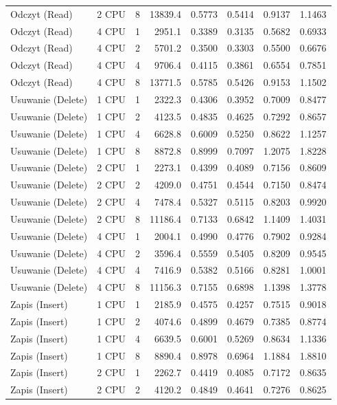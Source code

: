 \begin{table}[ht]
{\begin{tabular}{llcrrrrr}
Odczyt (Read) & 2 CPU & 8 & 13839.4 & 0.5773 & 0.5414 & 0.9137 & 1.1463 \\
Odczyt (Read) & 4 CPU & 1 & 2951.1 & 0.3389 & 0.3135 & 0.5682 & 0.6933 \\
Odczyt (Read) & 4 CPU & 2 & 5701.2 & 0.3500 & 0.3303 & 0.5500 & 0.6676 \\
Odczyt (Read) & 4 CPU & 4 & 9706.4 & 0.4115 & 0.3861 & 0.6554 & 0.7851 \\
Odczyt (Read) & 4 CPU & 8 & 13771.5 & 0.5785 & 0.5426 & 0.9153 & 1.1502 \\
Usuwanie (Delete) & 1 CPU & 1 & 2322.3 & 0.4306 & 0.3952 & 0.7009 & 0.8477 \\
Usuwanie (Delete) & 1 CPU & 2 & 4123.5 & 0.4835 & 0.4625 & 0.7292 & 0.8657 \\
Usuwanie (Delete) & 1 CPU & 4 & 6628.8 & 0.6009 & 0.5250 & 0.8622 & 1.1257 \\
Usuwanie (Delete) & 1 CPU & 8 & 8872.8 & 0.8999 & 0.7097 & 1.2075 & 1.8228 \\
Usuwanie (Delete) & 2 CPU & 1 & 2273.1 & 0.4399 & 0.4089 & 0.7156 & 0.8609 \\
Usuwanie (Delete) & 2 CPU & 2 & 4209.0 & 0.4751 & 0.4544 & 0.7150 & 0.8474 \\
Usuwanie (Delete) & 2 CPU & 4 & 7478.4 & 0.5327 & 0.5115 & 0.8203 & 0.9920 \\
Usuwanie (Delete) & 2 CPU & 8 & 11186.4 & 0.7133 & 0.6842 & 1.1409 & 1.4031 \\
Usuwanie (Delete) & 4 CPU & 1 & 2004.1 & 0.4990 & 0.4776 & 0.7902 & 0.9284 \\
Usuwanie (Delete) & 4 CPU & 2 & 3596.4 & 0.5559 & 0.5405 & 0.8209 & 0.9545 \\
Usuwanie (Delete) & 4 CPU & 4 & 7416.9 & 0.5382 & 0.5166 & 0.8281 & 1.0001 \\
Usuwanie (Delete) & 4 CPU & 8 & 11156.3 & 0.7155 & 0.6898 & 1.1398 & 1.3778 \\
Zapis (Insert) & 1 CPU & 1 & 2185.9 & 0.4575 & 0.4257 & 0.7515 & 0.9018 \\
Zapis (Insert) & 1 CPU & 2 & 4074.6 & 0.4899 & 0.4679 & 0.7385 & 0.8774 \\
Zapis (Insert) & 1 CPU & 4 & 6639.5 & 0.6001 & 0.5269 & 0.8634 & 1.1336 \\
Zapis (Insert) & 1 CPU & 8 & 8890.4 & 0.8978 & 0.6964 & 1.1884 & 1.8810 \\
Zapis (Insert) & 2 CPU & 1 & 2262.7 & 0.4419 & 0.4085 & 0.7172 & 0.8635 \\
Zapis (Insert) & 2 CPU & 2 & 4120.2 & 0.4849 & 0.4641 & 0.7276 & 0.8625 \\

\end{tabular}}
\end{table}
